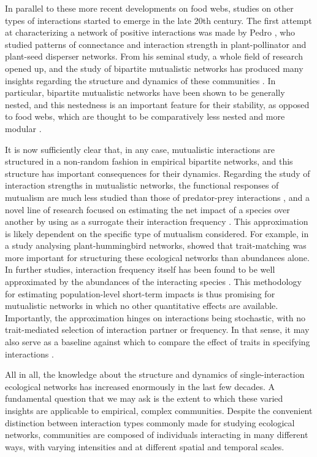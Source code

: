 In parallel to these more recent developments on food webs, studies on other types of interactions started to emerge in the late 20th century. The first attempt at characterizing a network of positive interactions was made by Pedro \citet{Jordano1987}, who studied patterns of connectance and interaction strength in plant-pollinator and plant-seed disperser networks. From his seminal study, a whole field of research opened up, and the study of bipartite mutualistic networks has produced many insights regarding the structure and dynamics of these communities \citep{Vazquez2009a, Bascompte2013}. In particular, bipartite mutualistic networks have been shown to be generally nested, and this nestedness is an important feature for their stability, as opposed to food webs, which are thought to be comparatively less nested and more modular \citep{Thebault2010}.

It is now sufficiently clear that, in any case, mutualistic interactions are structured in a non-random fashion in empirical bipartite networks, and this structure has important consequences for their dynamics. Regarding the study of interaction strengths in mutualistic networks, the functional responses of mutualism are much less studied than those of predator-prey interactions \citep{Holland2002}, and a novel line of research focused on estimating the net impact of a species over another by using as a surrogate their interaction frequency \citep{Vazquez2005}. This approximation is likely dependent on the specific type of mutualism considered. For example, in a study analysing plant-hummingbird networks, \cite{Vizentin-Bugoni2014} showed that trait-matching was more important for structuring these ecological networks than abundances alone. In further studies, interaction frequency itself has been found to be well approximated by the abundances of the interacting species \citep{Vazquez2007}. This methodology for estimating population-level short-term impacts is thus promising for mutualistic networks in which no other quantitative effects are available. Importantly, the approximation hinges on interactions being stochastic, with no trait-mediated selection of interaction partner or frequency. In that sense, it may also serve as a baseline against which to compare the effect of traits in specifying interactions \citep{Poisot2015}.

All in all, the knowledge about the structure and dynamics of single-interaction ecological networks has increased enormously in the last few decades. A fundamental question that we may ask is the extent to which these varied insights are applicable to empirical, complex communities. Despite the convenient distinction between interaction types commonly made for studying ecological networks, communities are composed of individuals interacting in many different ways, with varying intensities and at different spatial and temporal scales.

